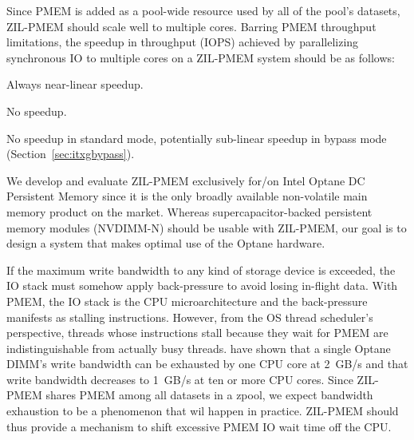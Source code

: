 \documentclass[12pt,a4paper,twoside]{book}
\begin{document}
Since PMEM is added as a pool-wide resource used by all of the pool's datasets, ZIL-PMEM should scale well to multiple cores.
Barring PMEM throughput limitations, the speedup in throughput (IOPS) achieved by parallelizing synchronous IO to multiple cores on a ZIL-PMEM system should be as follows:
{
\setlength{\parskip}{0pt}
\begin{description}[topsep=0pt, noitemsep, leftmargin=1cm, labelindent=1cm, widest=1 private dataset per thread]
    \item[1 private dataset per thread] Always near-linear speedup.
    \item[1 shared dataset] \mbox{}
          \begin{description}[noitemsep, leftmargin=1cm, labelindent=1cm, widest=ZPL filesystem]
              \item[ZPL filesystem] No speedup.
              \item[ZVOL] No speedup in standard mode, potentially sub-linear speedup in bypass mode (Section~\ref{sec:itxgbypass}).
          \end{description}
\end{description}
}

We develop and evaluate ZIL-PMEM exclusively for/on Intel Optane DC Persistent Memory since it is the only broadly available non-volatile main memory product on the market.
Whereas supercapacitor-backed persistent memory modules (NVDIMM-N) should be usable with ZIL-PMEM, our goal is to design a system that makes optimal use of the Optane hardware.

If the maximum write bandwidth to any kind of storage device is exceeded, the IO stack must somehow apply back-pressure to avoid losing in-flight data.
With PMEM, the IO stack is the CPU microarchitecture and the back-pressure manifests as stalling instructions.
However, from the OS thread scheduler's perspective, threads whose instructions stall because they wait for PMEM are indistinguishable from actually busy threads.
\citeauthor{yangEmpiricalGuideBehavior2020} have shown that a single Optane DIMM's write bandwidth can be exhausted by one CPU core at 2~GB/s and that write bandwidth decreases to 1~GB/s at ten or more CPU cores.
Since ZIL-PMEM shares PMEM among all datasets in a zpool, we expect bandwidth exhaustion to be a phenomenon that wil happen in practice.
ZIL-PMEM should thus provide a mechanism to shift excessive PMEM IO wait time off the CPU.
\end{document}
